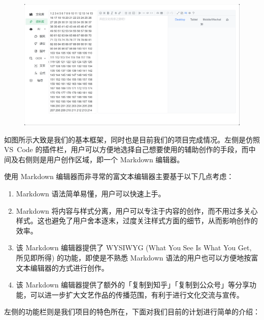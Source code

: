 \documentclass[
    UTF8,
    12pt,
    oneside,
    a4paper
]{ctexart}
\begin{document}
\begin{figure}[H]
    \centering
    \includegraphics[scale=0.18]{../../stuff/img/05-10_process.png}
\end{figure}

如图所示大致是我们的基本框架，同时也是目前我们的项目完成情况。左侧是仿照 VS~Code 的插件栏，用户可以方便地选择自己想要使用的辅助创作的手段，而中间及右侧则是用户创作区域，即一个 Markdown 编辑器。

使用 Markdown 编辑器而非寻常的富文本编辑器主要基于以下几点考虑：

\begin{enumerate}
    \item Markdown 语法简单易懂，用户可以快速上手。
    \item Markdown 将内容与样式分离，用户可以专注于内容的创作，而不用过多关心样式。这也避免了用户舍本逐末，过度关注样式方面的细节，从而影响创作的效率。
    \item 该 Markdown 编辑器提供了 WYSIWYG (What You See Is What You Get, 所见即所得) 的功能，即使是不熟悉 Markdown 语法的用户也可以方便地按富文本编辑器的方式进行创作。
    \item 该 Markdown 编辑器提供了额外的「复制到知乎」「复制到公众号」等分享功能，可以进一步扩大文艺作品的传播范围，有利于进行文化交流与宣传。
\end{enumerate}

左侧的功能栏则是我们项目的特色所在，下面对我们目前的计划进行简单的介绍：
\end{document}
